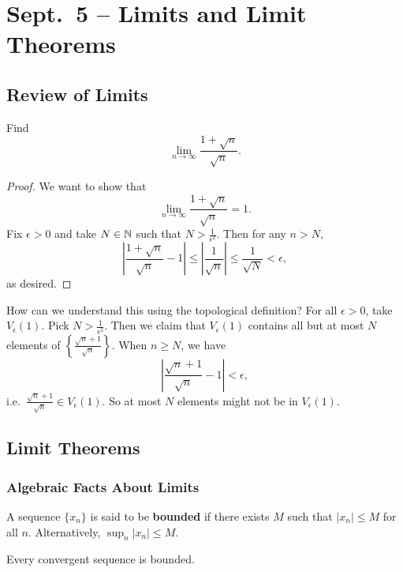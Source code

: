 \chapter{Sept.~5 -- Limits and Limit Theorems}

\section{Review of Limits}

\begin{example}
  Find
  \[
    \lim_{n \to \infty} \frac{1 + \sqrt{n}}{\sqrt{n}}
  .\]
\end{example}

\begin{proof}
  We want to show that
  \[
    \lim_{n \to \infty} \frac{1 + \sqrt{n}}{\sqrt{n}} = 1
  .\]
  Fix $\epsilon > 0$ and take $N \in \mathbb{N}$ such that
  $N > \frac{1}{\epsilon^2}$. Then for any $n > N$,
  \[
    \left\lvert \frac{1 + \sqrt{n}}{\sqrt{n}} - 1 \right\rvert \le
    \left\lvert \frac{1}{\sqrt{n}} \right\rvert
    \le \frac{1}{\sqrt{N}} < \epsilon
  ,\]
  as desired.
\end{proof}

How can we understand this using the topological definition?
For all $\epsilon > 0$, take $V_\epsilon(1)$. Pick
$N > \frac{1}{\epsilon^2}$. Then we claim that
$V_\epsilon(1)$ contains all but at most $N$ elements of
$\left\{\frac{\sqrt{n} + 1}{\sqrt{n}}\right\}$. When
$n \ge N$, we have
\[
  \left\lvert \frac{\sqrt{n} + 1}{\sqrt{n}} - 1 \right\rvert
  < \epsilon
,\]
i.e.~$\frac{\sqrt{n} + 1}{\sqrt{n}} \in V_\epsilon(1)$. So
at most $N$ elements might not be in $V_\epsilon(1)$.

\section{Limit Theorems}
\subsection{Algebraic Facts About Limits}
\begin{definition}
  A sequence $\{x_n\}$ is said to be \textbf{bounded} if there
  exists $M$ such that $|x_n| \le M$ for all $n$.
  Alternatively, $\sup_n |x_n| \le M$.
\end{definition}

\begin{theorem}
  Every convergent sequence is bounded.
\end{theorem}


